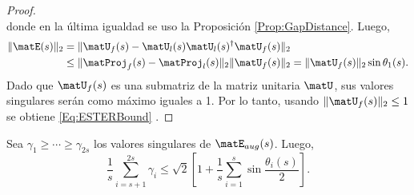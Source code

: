 \begin{proof}
\[	\]
	donde en la última igualdad se uso la Proposición \ref{Prop:GapDistance}. Luego,
	\begin{equation}
		\begin{aligned} \|\matE(s)\|_2 & = \|\matU_{f}(s) -\matU_{l}(s)\matU_l(s)^\dagger\matU_f(s)\|_2 \\
			&\le \|\matProj_f(s) - \matProj_l(s)\|_2\|\matU_f(s)\|_2 = \|\matU_f(s)\|_2\sin \theta_1(s). \end{aligned}
		\label{Eq:ESTER_gap_Theo}
	\end{equation}
	Dado que $\matU_f(s)$ es una submatriz de la matriz unitaria $\matU$, sus valores singulares serán como máximo iguales a 1. Por lo tanto,  usando $\|\matU_f(s)\|_2\leq 1$ se obtiene \eqref{Eq:ESTERBound} . \end{proof}


\begin{theorem}\label{The1:SAMOS}
	Sea $\gamma_1\ge\cdots\ge\gamma_{2s}$ los valores singulares de $\matE_{aug}(s)$. Luego,
	\begin{equation}
		\frac{1}{s}\sum_{i=s+1}^{2s}\gamma_i\le \sqrt{2}\left[1+\frac{1}{s}\sum_{i=1}^s\sin\frac{\theta_{i}(s)}{2}\right].
		\label{eq:Angle_Weyl}
	\end{equation}
\end{theorem}
